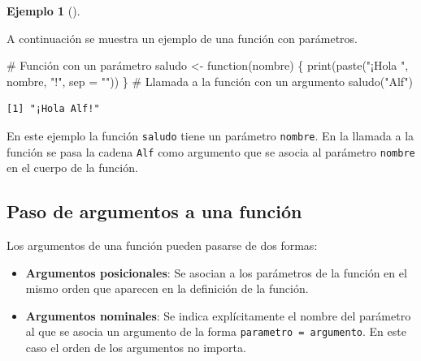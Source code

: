 \documentclass[
  a4paper,
]{scrreport}
\newenvironment{Shaded}{\begin{snugshade}}{\end{snugshade}}
\newcommand{\AttributeTok}[1]{\textcolor[rgb]{0.40,0.45,0.13}{#1}}
\newcommand{\CommentTok}[1]{\textcolor[rgb]{0.37,0.37,0.37}{#1}}
\newcommand{\ControlFlowTok}[1]{\textcolor[rgb]{0.00,0.23,0.31}{#1}}
\newcommand{\FunctionTok}[1]{\textcolor[rgb]{0.28,0.35,0.67}{#1}}
\newcommand{\NormalTok}[1]{\textcolor[rgb]{0.00,0.23,0.31}{#1}}
\newcommand{\OtherTok}[1]{\textcolor[rgb]{0.00,0.23,0.31}{#1}}
\newcommand{\StringTok}[1]{\textcolor[rgb]{0.13,0.47,0.30}{#1}}
\providecommand{\tightlist}{%
  \setlength{\itemsep}{0pt}\setlength{\parskip}{0pt}}\usepackage{longtable,booktabs,array}
\theoremstyle{definition}
\theoremstyle{definition}
\newtheorem{example}{Ejemplo}[chapter]
\theoremstyle{remark}
\begin{document}
\leavevmode{}%
\begin{example}[]\label{exm-funcion-con-parametros}

A continuación se muestra un ejemplo de una función con parámetros.

\begin{Shaded}
\begin{Highlighting}[]
\CommentTok{\# Función con un parámetro}
\NormalTok{saludo }\OtherTok{\textless{}{-}} \ControlFlowTok{function}\NormalTok{(nombre) \{}
  \FunctionTok{print}\NormalTok{(}\FunctionTok{paste}\NormalTok{(}\StringTok{"¡Hola "}\NormalTok{, nombre, }\StringTok{"!"}\NormalTok{, }\AttributeTok{sep =} \StringTok{""}\NormalTok{))}
\NormalTok{\}}
\CommentTok{\# Llamada a la función con un argumento}
\FunctionTok{saludo}\NormalTok{(}\StringTok{"Alf"}\NormalTok{)}
\end{Highlighting}
\end{Shaded}

\begin{verbatim}
[1] "¡Hola Alf!"
\end{verbatim}

En este ejemplo la función \texttt{saludo} tiene un parámetro
\texttt{nombre}. En la llamada a la función se pasa la cadena
\texttt{Alf} como argumento que se asocia al parámetro \texttt{nombre}
en el cuerpo de la función.

\end{example}

\hypertarget{paso-de-argumentos-a-una-funciuxf3n}{%
\subsection{Paso de argumentos a una
función}\label{paso-de-argumentos-a-una-funciuxf3n}}

Los argumentos de una función pueden pasarse de dos formas:

\begin{itemize}
\tightlist
\item
  \textbf{Argumentos posicionales}: Se asocian a los parámetros de la
  función en el mismo orden que aparecen en la definición de la función.
\item
  \textbf{Argumentos nominales}: Se indica explícitamente el nombre del
  parámetro al que se asocia un argumento de la forma
  \texttt{parametro\ =\ argumento}. En este caso el orden de los
  argumentos no importa.
\end{itemize}
\end{document}
